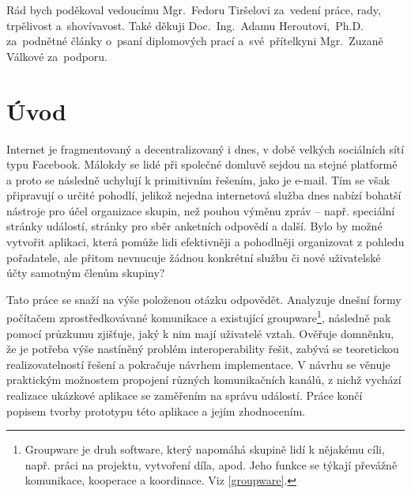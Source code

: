 \documentclass[12pt,oneside,final]{fithesis2}
\begin{document}
\FrontMatter
\ThesisTitlePage



\begin{ThesisDeclaration}
\DeclarationText
\AdvisorName
\end{ThesisDeclaration}



\begin{ThesisThanks}
Rád bych poděkoval vedoucímu Mgr.~Fedoru Tiršelovi za~vedení práce, rady, trpělivost a~shovívavost. Také děkuji Doc.~Ing.~Adamu Heroutovi,~Ph.D. za~podnětné články o~psaní diplomových prací a~své~přítelkyni Mgr.~Zuzaně Válkové za~podporu.
\end{ThesisThanks}









\tableofcontents
\listoffigures



\MainMatter



\chapter{Úvod}\label{introduction}
Internet je fragmentovaný a decentralizovaný i dnes, v době velkých sociálních sítí typu Facebook. Málokdy se lidé při společné domluvě sejdou na stejné platformě a proto se následně uchylují k primitivním řešením, jako je e-mail. Tím se však připravují o určité pohodlí, jelikož nejedna internetová služba dnes nabízí bohatší nástroje pro účel organizace skupin, než pouhou výměnu zpráv -- např. speciální stránky událostí, stránky pro sběr anketních odpovědí a další. Bylo by možné vytvořit aplikaci, která pomůže lidi efektivněji a pohodlněji organizovat z pohledu pořadatele, ale přitom nevnucuje žádnou konkrétní službu či nové uživatelské účty samotným členům skupiny?

Tato práce se snaží na výše položenou otázku odpovědět. Analyzuje dnešní formy počítačem zprostředkovávané komunikace a existující groupware\footnote{Groupware je druh software, který napomáhá skupině lidí k nějakému cíli, např. práci na projektu, vytvoření díla, apod. Jeho funkce se týkají převážně komunikace, kooperace a koordinace. Viz \ref{groupware}.}, následně pak pomocí průzkumu zjišťuje, jaký k nim mají uživatelé vztah. Ověřuje domněnku, že je potřeba výše nastíněný problém interoperability řešit, zabývá se teoretickou realizovatelností řešení a pokračuje návrhem implementace. V návrhu se věnuje praktickým možnostem propojení různých komunikačních kanálů, z nichž vychází realizace ukázkové aplikace se zaměřením na správu událostí. Práce končí popisem tvorby prototypu této aplikace a jejím zhodnocením.
\end{document}
